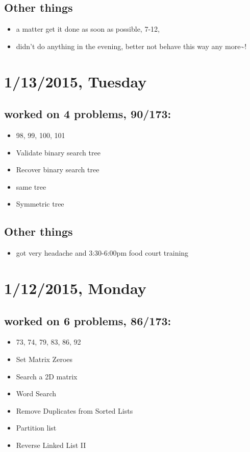 \documentclass[9pt,b5paper]{article}
\begin{document}
\subsection{Other things}
\label{sec-13-2}
\begin{itemize}
\item a matter get it done as soon as possible, 7-12,
\item didn't do anything in the evening, better not behave this way any more\textasciitilde{}!
\end{itemize}
\section{1/13/2015, Tuesday}
\label{sec-14}
\subsection{worked on 4 problems, 90/173:}
\label{sec-14-1}
\begin{itemize}
\item 98, 99, 100, 101
\item Validate binary search tree
\item Recover binary search tree
\item same tree
\item Symmetric tree
\end{itemize}
\subsection{Other things}
\label{sec-14-2}
\begin{itemize}
\item got very headache and 3:30-6:00pm food court training
\end{itemize}
\section{1/12/2015, Monday}
\label{sec-15}
\subsection{worked on 6 problems, 86/173:}
\label{sec-15-1}
\begin{itemize}
\item 73, 74, 79, 83, 86, 92
\item Set Matrix Zeroes
\item Search a 2D matrix
\item Word Search
\item Remove Duplicates from Sorted Lists
\item Partition list
\item Reverse Linked List II
\end{itemize}
\end{document}
